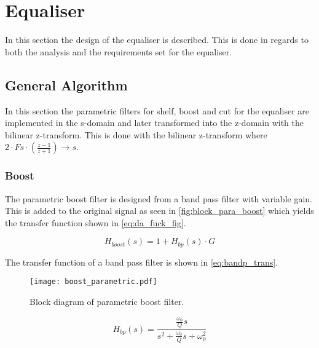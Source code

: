 
\section{Equaliser}\label{sec:equaliser_design}
In this section the design of the equaliser is described. This is done in regards to both the analysis and the requirements set for the equaliser.

\subsection{General Algorithm}
In this section the parametric filters for shelf, boost and cut for the equaliser are implemented in the s-domain and later transformed into the z-domain with the bilinear z-transform. This is done with the bilinear z-transform where $ 2\cdot Fs\cdot (\frac{z-1}{z+1}) \rightarrow s$.

\subsubsection{Boost}
The parametric boost filter is designed from a band pass filter with variable gain. This is added to the original signal as seen in \autoref{fig:block_para_boost} which yields the transfer function shown in \autoref{eq:da_fuck_fig}.

\begin{equation}
	H_{boost}(s)=1+H_{bp}(s)\cdot G
	\label{eq:da_fuck_fig}
\end{equation}

\startexplain
{}
\stopexplain


The transfer function of a band pass filter is shown in \autoref{eq:bandp_trans}.

\begin{figure}[htbp]
    \centering
    \texttt{[image: boost\_parametric.pdf]}
    \caption{Block diagram of parametric boost filter.}
    \label{fig:block_para_boost}
\end{figure}


\begin{equation}\label{eq:bandp_trans}
H_{bp}(s)=\frac{\frac{\omega_0}{Q}s}{s^2+\frac{\omega_0}{Q}s+\omega_0^2}
\end{equation}

